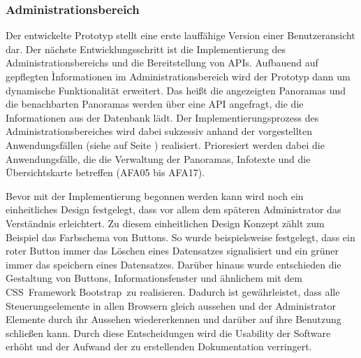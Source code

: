 \subsubsection{Administrationsbereich}
\label{sec:UmsetzungAdministrationsbereich}

Der entwickelte Prototyp stellt eine erste lauffähige Version einer Benutzeransicht dar. Der nächste Entwicklungsschritt ist die Implementierung des Administrationsbereichs und die Bereitstellung von APIs. Aufbauend auf gepflegten Ìnformationen im Administrationsbereich wird der Prototyp dann um dynamische Funktionalität erweitert. Das heißt die angezeigten Panoramas und die benachbarten Panoramas werden über eine API angefragt, die die Informationen aus der Datenbank lädt. Der Implementierungsprozess des Administrationsbereiches wird dabei sukzessiv anhand der vorgestellten Anwendungsfällen (siehe  auf Seite \pageref{sec:Adminstratoranwendungen}) realisiert. Prioresiert werden dabei die Anwendungsfälle, die die Verwaltung der Panoramas, Infotexte und die Übersichtskarte betreffen (AFA05 bis AFA17).

Bevor mit der Implementierung begonnen werden kann wird noch ein einheitliches Design festgelegt, dass vor allem dem späteren Administrator das Verständnis erleichtert. Zu diesem einheitlichen Design Konzept zählt zum Beispiel das Farbschema von Buttons. So wurde beispielsweise festgelegt, dass ein roter Button immer das Löschen eines Datensatzes signalisiert und ein grüner immer das speichern eines Datensatzes. Darüber hinaus wurde entschieden die Gestaltung von Buttons, Informationsfenster und ähnlichem mit dem CSS\footnotemark\ Framework Bootstrap\footnotemark\ zu realisieren. Dadurch ist gewährleistet, dass alle Steuerungselemente in allen Browsern gleich aussehen und der Administrator Elemente durch ihr Aussehen wiedererkennen und darüber auf ihre Benutzung schließen kann. Durch diese Entscheidungen wird die Usability der Software erhöht und der Aufwand der zu erstellenden Dokumentation verringert.



